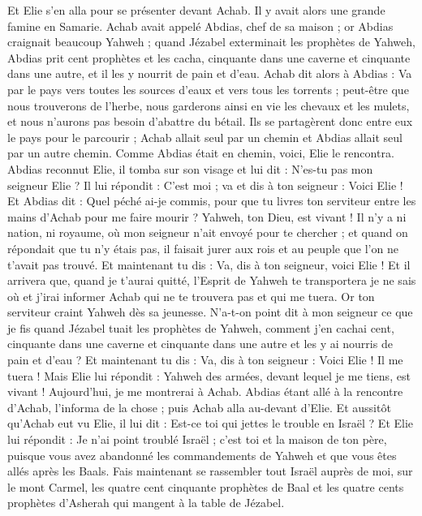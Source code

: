 \begin{multicols}{2}
Et Elie s'en alla pour se présenter devant Achab. Il y avait alors une grande famine en Samarie.
Achab avait appelé Abdias, chef de sa maison ; or Abdias craignait beaucoup Yahweh ;
quand Jézabel exterminait les prophètes de Yahweh, Abdias prit cent prophètes et les cacha, cinquante dans une caverne et cinquante dans une autre, et il les y nourrit de pain et d'eau.
Achab dit alors à Abdias : Va par le pays vers toutes les sources d'eaux et vers tous les torrents ; peut-être que nous trouverons de l'herbe, nous garderons ainsi en vie les chevaux et les mulets, et nous n'aurons pas besoin d'abattre du bétail.
Ils se partagèrent donc entre eux le pays pour le parcourir ; Achab allait seul par un chemin et Abdias allait seul par un autre chemin.
Comme Abdias était en chemin, voici, Elie le rencontra. Abdias reconnut Elie, il tomba sur son visage et lui dit : N'es-tu pas mon seigneur Elie ?
Il lui répondit : C'est moi ; va et dis à ton seigneur : Voici Elie !
Et Abdias dit : Quel péché ai-je commis, pour que tu livres ton serviteur entre les mains d'Achab pour me faire mourir ?
Yahweh, ton Dieu, est vivant ! Il n'y a ni nation, ni royaume, où mon seigneur n'ait envoyé pour te chercher ; et quand on répondait que tu n'y étais pas, il faisait jurer aux rois et au peuple que l'on ne t'avait pas trouvé.
Et maintenant tu dis : Va, dis à ton seigneur, voici Elie !
Et il arrivera que, quand je t'aurai quitté, l'Esprit de Yahweh te transportera je ne sais où et j'irai informer Achab qui ne te trouvera pas et qui me tuera. Or ton serviteur craint Yahweh dès sa jeunesse.
N'a-t-on point dit à mon seigneur ce que je fis quand Jézabel tuait les prophètes de Yahweh, comment j'en cachai cent, cinquante dans une caverne et cinquante dans une autre et les y ai nourris de pain et d'eau ?
Et maintenant tu dis : Va, dis à ton seigneur : Voici Elie ! Il me tuera !
Mais Elie lui répondit : Yahweh des armées, devant lequel je me tiens, est vivant ! Aujourd'hui, je me montrerai à Achab.
Abdias étant allé à la rencontre d'Achab, l'informa de la chose ; puis Achab alla au-devant d'Elie.
Et aussitôt qu'Achab eut vu Elie, il lui dit : Est-ce toi qui jettes le trouble en Israël ?
Et Elie lui répondit : Je n'ai point troublé Israël ; c'est toi et la maison de ton père, puisque vous avez abandonné les commandements de Yahweh et que vous êtes allés après les Baals.
Fais maintenant se rassembler tout Israël auprès de moi, sur le mont Carmel, les quatre cent cinquante prophètes de Baal et les quatre cents prophètes d'Asherah qui mangent à la table de Jézabel.

\end{multicols}
